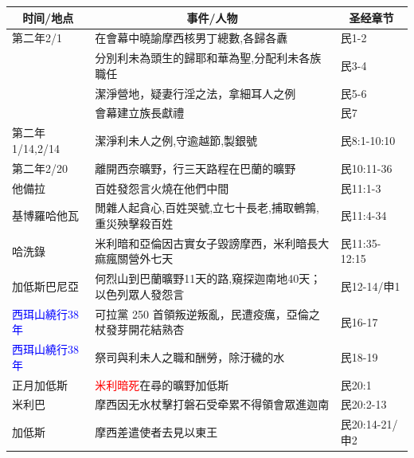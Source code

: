 \begin{table}[H]
\centering
\begin{tabular}{p{3.2cm}|p{11cm}|p{3.2cm}}\hline\hline
\multicolumn{1}{c|}{时间/地点}&\multicolumn{1}{c|}{事件/人物}&\multicolumn{1}{c}{圣经章节}\\\hline
第二年2/1&在會幕中曉諭摩西核男丁總數,各歸各纛&民1-2\\\hline
&分別利未為頭生的歸耶和華為聖,分配利未各族職任&民3-4\\\hline
&潔淨營地，疑妻行淫之法，拿細耳人之例&民5-6\\\hline
&會幕建立族長獻禮&民7\\\hline
第二年1/14,2/14&潔淨利未人之例,守逾越節,製銀號&民8:1-10:10\\\hline
第二年2/20&離開西奈曠野，行三天路程在巴蘭的曠野&民10:11-36\\\hline
他備拉&百姓發怨言火燒在他們中間&民11:1-3\\\hline
基博羅哈他瓦&閒雜人起貪心,百姓哭號,立七十長老,捕取鵪鶉,重災殃擊殺百姓&民11:4-34\\\hline
哈洗錄&米利暗和亞倫因古實女子毀謗摩西，米利暗長大痲瘋關營外七天&民11:35-12:15\\\hline


加低斯巴尼亞&何烈山到巴蘭曠野11天的路,窺探迦南地40天；以色列眾人發怨言&民12-14/申1\\\hline
\textcolor{blue}{西珥山繞行38年}&可拉黨 250 首領叛逆叛亂，民遭疫癘，亞倫之杖發芽開花結熟杏&民16-17\\\hline
\textcolor{blue}{西珥山繞行38年}&祭司與利未人之職和酬勞，除汙穢的水&民18-19\\\hline
正月加低斯&\textcolor{red}{米利暗死}在尋的曠野加低斯&民20:1\\\hline
米利巴&摩西因无水杖擊打磐石受牵累不得領會眾進迦南&民20:2-13\\\hline
加低斯&摩西差遣使者去見以東王&民20:14-21/申2\\\hline


\end{tabular}
\end{table}
